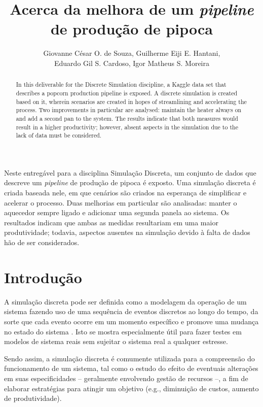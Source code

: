 \documentclass[12pt]{article}
\title{Acerca da melhora de um \textit{pipeline} de produção de pipoca}
\author{Giovanne César O. de Souza\inst{1}, Guilherme Eiji E. Hantani\inst{1},\\Eduardo Gil S. Cardoso\inst{1}, Igor Matheus S. Moreira\inst{1}}
\begin{document}
 

\maketitle

\begin{abstract}
    In this deliverable for the Discrete Simulation discipline, a Kaggle data set that describes a popcorn production pipeline is exposed. A discrete simulation is created based on it, wherein scenarios are created in hopes of streamlining and accelerating the process. Two improvements in particular are analysed: maintain the heater always on and add a second pan to the system. The results indicate that both measures would result in a higher productivity; however, absent aspects in the simulation due to the lack of data must be considered.
\end{abstract}
     
\begin{resumo}
    Neste entregável para a disciplina Simulação Discreta, um conjunto de dados que descreve um \textit{pipeline} de produção de pipoca é exposto. Uma simulação discreta é criada baseada nele, em que cenários são criados na esperança de simplificar e acelerar o processo. Duas melhorias em particular são analisadas: manter o aquecedor sempre ligado e adicionar uma segunda panela ao sistema. Os resultados indicam que ambas as medidas resultariam em uma maior produtividade; todavia, aspectos ausentes na simulação devido à falta de dados hão de ser considerados.
\end{resumo}

\section{Introdução}

A simulação discreta pode ser definida como a modelagem da operação de um sistema fazendo uso de uma sequência de eventos discretos ao longo do tempo, da sorte que cada evento ocorre em um momento específico e promove uma mudança no estado do sistema \cite{robinson2014simulation}. Isto se mostra especialmente útil para fazer testes em modelos de sistema reais sem sujeitar o sistema real a qualquer estresse.

Sendo assim, a simulação discreta é comumente utilizada para a compreensão do funcionamento de um sistema, tal como o estudo do efeito de eventuais alterações em suas especificidades -- geralmente envolvendo gestão de recursos --, a fim de elaborar estratégias para atingir um objetivo (e.g., diminuição de custos, aumento de produtividade).
\end{document}
